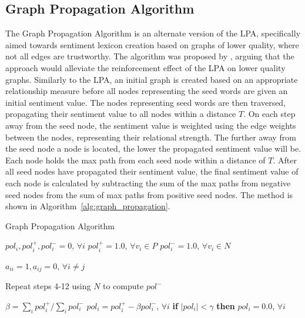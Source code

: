 \subsection{Graph Propagation Algorithm}
\label{sec:graph_propagation_algorithm}
The Graph Propagation Algorithm is an alternate version of the LPA, specifically aimed towards sentiment lexicon creation based on graphs of lower quality, where not all edges are trustworthy. The algorithm was proposed by \cite{Velikovich2010}, arguing that the approach would alleviate the reinforcement effect of the LPA on lower quality graphs. Similarly to the LPA, an initial graph is created based on an appropriate relationship measure before all nodes representing the seed words are given an initial sentiment value. The nodes representing seed words are then traversed, propagating their sentiment value to all nodes within a distance $T$. On each step away from the seed node, the sentiment value is weighted using the edge weights between the nodes, representing their relational strength. The further away from the seed node a node is located, the lower the propagated sentiment value will be. Each node holds the max path from each seed node within a distance of $T$. After all seed nodes have propagated their sentiment value, the final sentiment value of each node is calculated by subtracting the sum of the max paths from negative seed nodes from the sum of max paths from positive seed nodes. The method is shown in Algorithm~\ref{alg:graph_propagation}. \\

\begin{algorithm}[t]
	\DontPrintSemicolon
    \caption{Graph Propagation Algorithm}
    \label{alg:graph_propagation}
    
    $pol_i, pol_i^+, pol_i^- = 0$, $\forall i$\;
	$pol_i^+ = 1.0$, $\forall v_i \in P$\;
    $pol_i^- = 1.0$, $\forall v_i \in N$\;

	$a_{ii} = 1, a_{ij} = 0$, $\forall i \neq j$\;


	Repeat steps 4-12 using $N$ to compute $pol^-$\;

	$\beta = \sum_i pol_i^+ / \sum_i pol_i^-$\;
	$pol_i = pol_i^+ - \beta pol_i^-$, $\forall i$\;
	\textbf{if} $|pol_i| < \gamma$ \textbf{then} $pol_i=0.0$, $\forall i$\;
\end{algorithm}

